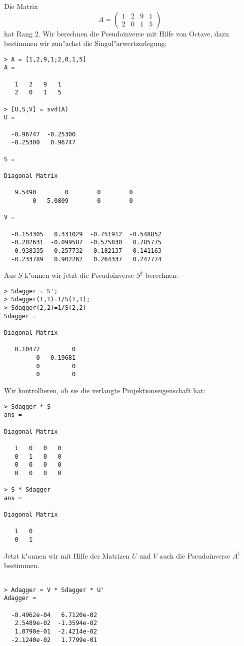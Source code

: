 \begin{beispiel}
Die Matrix
\[
A=\begin{pmatrix}
1&2&9&1\\
2&0&1&5
\end{pmatrix}
\]
hat Rang $2$.
Wir berechnen die Pseudoinverse mit Hilfe von Octave, dazu bestimmen wir
zun"achst die Singul"arwertzerlegung:
\begin{verbatim}
> A = [1,2,9,1;2,0,1,5]
A =

   1   2   9   1
   2   0   1   5

> [U,S,V] = svd(A)
U =

  -0.96747  -0.25300
  -0.25300   0.96747

S =

Diagonal Matrix

   9.5490        0        0        0
        0   5.0809        0        0

V =

  -0.154305   0.331029  -0.751912  -0.548852
  -0.202631  -0.099587  -0.575830   0.785775
  -0.938335  -0.257732   0.182137  -0.141163
  -0.233789   0.902262   0.264337   0.247774
\end{verbatim}
Aus $S$ k"onnen wir jetzt die Pseudoinverse $S^\dagger$ berechnen:
\begin{verbatim}
> Sdagger = S';
> Sdagger(1,1)=1/S(1,1);
> Sdagger(2,2)=1/S(2,2)
Sdagger =

Diagonal Matrix

   0.10472         0
         0   0.19681
         0         0
         0         0
\end{verbatim}
Wir kontrollieren, ob sie die verlangte Projektionseigenschaft hat:
\begin{verbatim}
> Sdagger * S
ans =

Diagonal Matrix

   1   0   0   0
   0   1   0   0
   0   0   0   0
   0   0   0   0

> S * Sdagger
ans =

Diagonal Matrix

   1   0
   0   1
\end{verbatim}
Jetzt k"onnen wir mit Hilfe der Matrizen $U$ und $V$ auch die Pseudoinverse
$A^\dagger$ bestimmen.
\begin{verbatim}

> Adagger = V * Sdagger * U'
Adagger =

  -8.4962e-04   6.7120e-02
   2.5489e-02  -1.3594e-02
   1.0790e-01  -2.4214e-02
  -2.1240e-02   1.7799e-01


\end{verbatim}
\end{beispiel}
